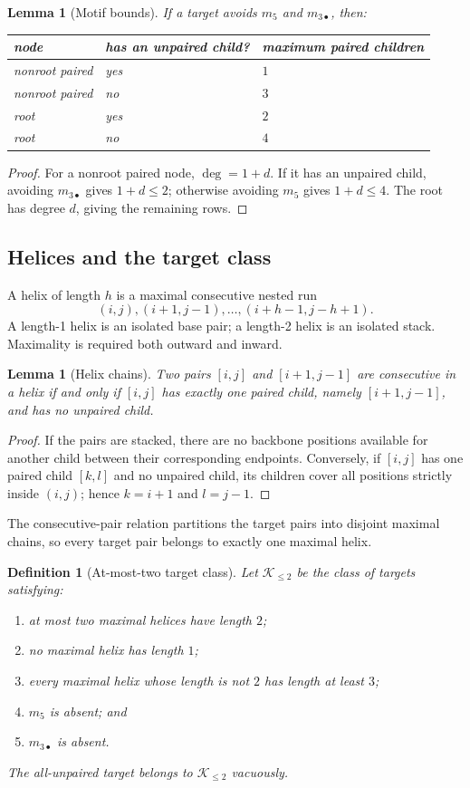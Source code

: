 \documentclass[11pt]{article}
\newtheorem{lemma}[theorem]{Lemma}
\newtheorem{definition}[theorem]{Definition}
\newcommand{\Ktwo}{\mathcal{K}_{\le 2}}
\begin{document}
\begin{lemma}[Motif bounds]
If a target avoids $m_5$ and $m_{3\bullet}$, then:
\begin{center}
\begin{tabular}{lll}
\toprule
node & has an unpaired child? & maximum paired children \\
\midrule
nonroot paired & yes & $1$ \\
nonroot paired & no & $3$ \\
root & yes & $2$ \\
root & no & $4$ \\
\bottomrule
\end{tabular}
\end{center}
\end{lemma}
\begin{proof}
For a nonroot paired node, $\deg=1+d$.  If it has an unpaired child, avoiding $m_{3\bullet}$ gives $1+d\le2$; otherwise avoiding $m_5$ gives $1+d\le4$.  The root has degree $d$, giving the remaining rows.
\end{proof}

\subsection{Helices and the target class}

A helix of length $h$ is a maximal consecutive nested run
\[
(i,j),(i+1,j-1),\dots,(i+h-1,j-h+1).
\]
A length-1 helix is an isolated base pair; a length-2 helix is an isolated stack.  Maximality is required both outward and inward.

\begin{lemma}[Helix chains]
Two pairs $[i,j]$ and $[i+1,j-1]$ are consecutive in a helix if and only if $[i,j]$ has exactly one paired child, namely $[i+1,j-1]$, and has no unpaired child.
\end{lemma}
\begin{proof}
If the pairs are stacked, there are no backbone positions available for another child between their corresponding endpoints.  Conversely, if $[i,j]$ has one paired child $[k,l]$ and no unpaired child, its children cover all positions strictly inside $(i,j)$; hence $k=i+1$ and $l=j-1$.
\end{proof}

The consecutive-pair relation partitions the target pairs into disjoint maximal chains, so every target pair belongs to exactly one maximal helix.

\begin{definition}[At-most-two target class]
Let $\Ktwo$ be the class of targets satisfying:
\begin{enumerate}
\item at most two maximal helices have length $2$;
\item no maximal helix has length $1$;
\item every maximal helix whose length is not $2$ has length at least $3$;
\item $m_5$ is absent; and
\item $m_{3\bullet}$ is absent.
\end{enumerate}
The all-unpaired target belongs to $\Ktwo$ vacuously.
\end{definition}
\end{document}
